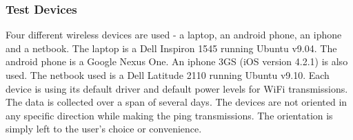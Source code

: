 \subsubsection{Test Devices}
\label{subsubsec:testdevices}

Four different wireless devices are used - a laptop, an android phone, an iphone and a netbook. The laptop is a Dell Inspiron 1545 running Ubuntu v9.04. The android phone is a Google Nexus One. An iphone 3GS (iOS version 4.2.1) is also used. The netbook used is a Dell Latitude 2110 running Ubuntu v9.10. Each device is using its default driver and default power levels for WiFi transmissions. %
The data is collected over a span of several days. The devices are not oriented
in any specific direction while making the ping transmissions. The orientation is simply left to the user's choice or convenience. 

%
